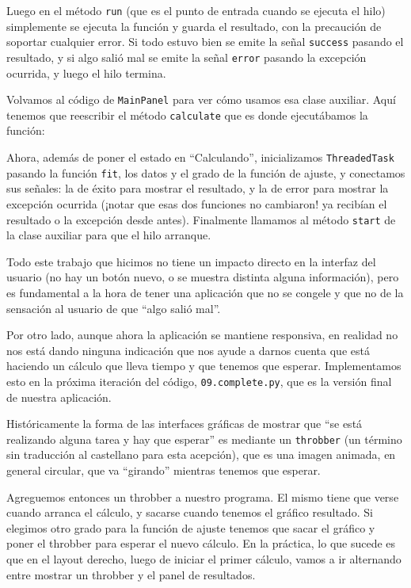 Luego en el método \texttt{run} (que es el punto de entrada cuando se ejecuta el hilo) simplemente se ejecuta la función y guarda el resultado, con la precaución de soportar cualquier error. Si todo estuvo bien se emite la señal \texttt{success} pasando el resultado, y si algo salió mal se emite la señal \texttt{error} pasando la excepción ocurrida, y luego el hilo termina.

Volvamos al código de \texttt{MainPanel} para ver cómo usamos esa clase auxiliar. Aquí tenemos que reescribir el método \texttt{calculate} que es donde ejecutábamos la función:


Ahora, además de poner el estado en ``Calculando'', inicializamos \texttt{ThreadedTask} pasando la función \texttt{fit}, los datos y el grado de la función de ajuste, y conectamos sus señales: la de éxito para mostrar el resultado, y la de error para mostrar la excepción ocurrida (¡notar que esas dos funciones no cambiaron! ya recibían el resultado o la excepción desde antes). Finalmente llamamos al método \texttt{start} de la clase auxiliar para que el hilo arranque.

Todo este trabajo que hicimos no tiene un impacto directo en la interfaz del usuario (no hay un botón nuevo, o se muestra distinta alguna información), pero es fundamental a la hora de tener una aplicación que no se congele y que no de la sensación al usuario de que ``algo salió mal''.

Por otro lado, aunque ahora la aplicación se mantiene responsiva, en realidad no nos está dando ninguna indicación que nos ayude a darnos cuenta que está haciendo un cálculo que lleva tiempo y que tenemos que esperar. Implementamos esto en la próxima iteración del código, \texttt{09.complete.py}, que es la versión final de nuestra aplicación.

Históricamente la forma de las interfaces gráficas de mostrar que ``se está realizando alguna tarea y hay que esperar'' es mediante un \texttt{throbber} (un término sin traducción al castellano para esta acepción), que es una imagen animada, en general circular, que va ``girando'' mientras tenemos que esperar.

Agreguemos entonces un throbber a nuestro programa. El mismo tiene que verse cuando arranca el cálculo, y sacarse cuando tenemos el gráfico resultado. Si elegimos otro grado para la función de ajuste tenemos que sacar el gráfico y poner el throbber para esperar el nuevo cálculo. En la práctica, lo que sucede es que en el layout derecho, luego de iniciar el primer cálculo, vamos a ir alternando entre mostrar un throbber y el panel de resultados.

